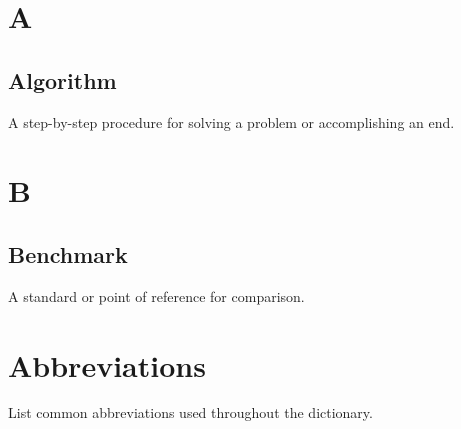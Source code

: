 \documentclass[
    language=english,
    doctype=dictionary,
    institution=none,
    titlestyle=book
]{../../omnilatex}
\begin{document}
\frontmatter
\maketitle

\tableofcontents

\mainmatter
\chapter{A}
\section{Algorithm}
A step-by-step procedure for solving a problem or accomplishing an end.

\chapter{B}
\section{Benchmark}
A standard or point of reference for comparison.

\appendix
\chapter{Abbreviations}
List common abbreviations used throughout the dictionary.
\end{document}
